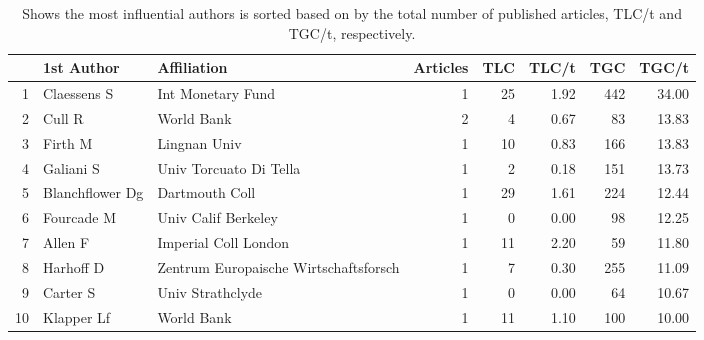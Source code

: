 \begin{table}[ht]
\begin{tabular}{rllrrrrr}
\midrule
   & 1st Author & Affiliation & Articles & TLC & TLC/t & TGC & TGC/t \\ 
\midrule

1 & Claessens S & Int Monetary Fund &   1 &  25 & 1.92 & 442 & 34.00 \\ 
2 & Cull R & World Bank &   2 &   4 & 0.67 &  83 & 13.83 \\ 
3 & Firth M & Lingnan Univ &   1 &  10 & 0.83 & 166 & 13.83 \\ 
4 & Galiani S & Univ Torcuato Di Tella &   1 &   2 & 0.18 & 151 & 13.73 \\ 
5 & Blanchflower Dg & Dartmouth Coll &   1 &  29 & 1.61 & 224 & 12.44 \\ 
6 & Fourcade M & Univ Calif Berkeley &   1 &   0 & 0.00 &  98 & 12.25 \\ 
7 & Allen F & Imperial Coll London &   1 &  11 & 2.20 &  59 & 11.80 \\ 
8 & Harhoff D & Zentrum Europaische Wirtschaftsforsch &   1 &   7 & 0.30 & 255 & 11.09 \\ 
9 & Carter S & Univ Strathclyde &   1 &   0 & 0.00 &  64 & 10.67 \\ 
10 & Klapper Lf & World Bank &   1 &  11 & 1.10 & 100 & 10.00 \\
\bottomrule

\end{tabular}
\caption{Shows the most influential authors is sorted  based on by the total number of published articles, TLC/t and TGC/t, respectively.} 
\label{tab:AUTHR}
\end{table}

